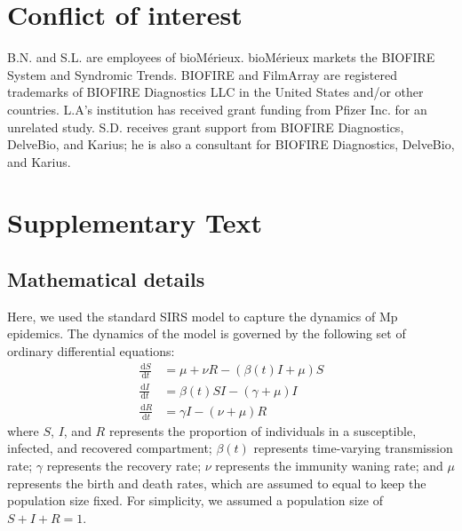 \documentclass[12pt]{article}
\newcommand{\dd}[1]{\ensuremath{\, \mathrm{d}#1}}
\begin{document}
\section*{Conflict of interest}

B.N. and S.L. are employees of bioMérieux. bioMérieux markets the BIOFIRE System and Syndromic Trends. 
BIOFIRE and FilmArray are registered trademarks of BIOFIRE Diagnostics LLC in the United States and/or other countries.
L.A's institution has received grant funding from Pfizer Inc. for an unrelated study.
S.D. receives grant support from BIOFIRE Diagnostics, DelveBio, and Karius; he is also a consultant for BIOFIRE Diagnostics, DelveBio, and Karius.

\pagebreak

\section*{Supplementary Text}
\setcounter{figure}{0}
\setcounter{equation}{0}
\renewcommand{\thefigure}{S\arabic{figure}}
\renewcommand{\theequation}{S\arabic{equation}}

\subsection*{Mathematical details}

Here, we used the standard SIRS model to capture the dynamics of Mp epidemics.
The dynamics of the model is governed by the following set of ordinary differential equations:
\begin{align}
\frac{\dd S}{\dd t} &= \mu + \nu R - (\beta(t) I + \mu) S\\
\frac{\dd I}{\dd t} &= \beta(t) SI - (\gamma + \mu) I\\
\frac{\dd R}{\dd t} &= \gamma I - (\nu+\mu) R
\end{align}
where $S$, $I$, and $R$ represents the proportion of individuals in a susceptible, infected, and recovered compartment;
$\beta(t)$ represents time-varying transmission rate;
$\gamma$ represents the recovery rate;
$\nu$ represents the immunity waning rate;
and $\mu$ represents the birth and death rates, which are assumed to equal to keep the population size fixed.
For simplicity, we assumed a population size of $S+I+R=1$.
\end{document}
